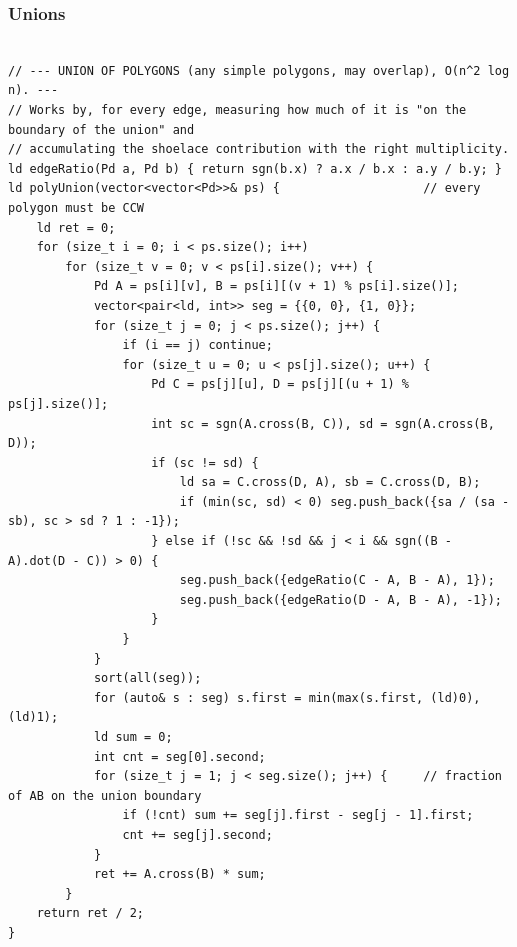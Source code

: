 \documentclass[9pt,a4paper,twocolumn]{extarticle}
\begin{document}
\filbreak
\subsubsection{Unions}
\nopagebreak
\begin{lstlisting}

// --- UNION OF POLYGONS (any simple polygons, may overlap), O(n^2 log n). ---
// Works by, for every edge, measuring how much of it is "on the boundary of the union" and
// accumulating the shoelace contribution with the right multiplicity.
ld edgeRatio(Pd a, Pd b) { return sgn(b.x) ? a.x / b.x : a.y / b.y; }
ld polyUnion(vector<vector<Pd>>& ps) {                    // every polygon must be CCW
    ld ret = 0;
    for (size_t i = 0; i < ps.size(); i++)
        for (size_t v = 0; v < ps[i].size(); v++) {
            Pd A = ps[i][v], B = ps[i][(v + 1) % ps[i].size()];
            vector<pair<ld, int>> seg = {{0, 0}, {1, 0}};
            for (size_t j = 0; j < ps.size(); j++) {
                if (i == j) continue;
                for (size_t u = 0; u < ps[j].size(); u++) {
                    Pd C = ps[j][u], D = ps[j][(u + 1) % ps[j].size()];
                    int sc = sgn(A.cross(B, C)), sd = sgn(A.cross(B, D));
                    if (sc != sd) {
                        ld sa = C.cross(D, A), sb = C.cross(D, B);
                        if (min(sc, sd) < 0) seg.push_back({sa / (sa - sb), sc > sd ? 1 : -1});
                    } else if (!sc && !sd && j < i && sgn((B - A).dot(D - C)) > 0) {
                        seg.push_back({edgeRatio(C - A, B - A), 1});
                        seg.push_back({edgeRatio(D - A, B - A), -1});
                    }
                }
            }
            sort(all(seg));
            for (auto& s : seg) s.first = min(max(s.first, (ld)0), (ld)1);
            ld sum = 0;
            int cnt = seg[0].second;
            for (size_t j = 1; j < seg.size(); j++) {     // fraction of AB on the union boundary
                if (!cnt) sum += seg[j].first - seg[j - 1].first;
                cnt += seg[j].second;
            }
            ret += A.cross(B) * sum;
        }
    return ret / 2;
}


\end{lstlisting}
\end{document}
